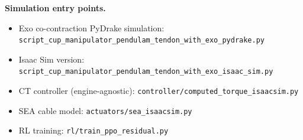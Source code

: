 \documentclass[11pt, a4paper]{article}
\begin{document}
\begin{infobox}
\textbf{Simulation entry points.}
\begin{itemize}[nosep]
  \item Exo co-contraction PyDrake simulation:
        \texttt{script\_cup\_manipulator\_pendulam\_tendon\_with\_exo\_pydrake.py}
  \item Isaac Sim version:
        \texttt{script\_cup\_manipulator\_pendulam\_tendon\_with\_exo\_isaac\_sim.py}
  \item CT controller (engine-agnostic):
        \texttt{controller/computed\_torque\_isaacsim.py}
  \item SEA cable model:
        \texttt{actuators/sea\_isaacsim.py}
  \item RL training:
        \texttt{rl/train\_ppo\_residual.py}
\end{itemize}
\end{infobox}



\end{document}
